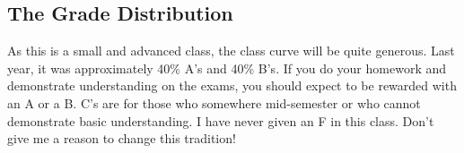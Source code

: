 
\subsection*{The Grade Distribution}

As this is a small and advanced class, the class curve will be quite generous. Last year, it was approximately 40\% A's and 40\% B's. If you do your homework and demonstrate understanding on the exams, you should expect to be rewarded with an A or a B. C's are for those who  somewhere mid-semester or who cannot demonstrate basic understanding. I have never given an F in this class. Don't give me a reason to change this tradition!